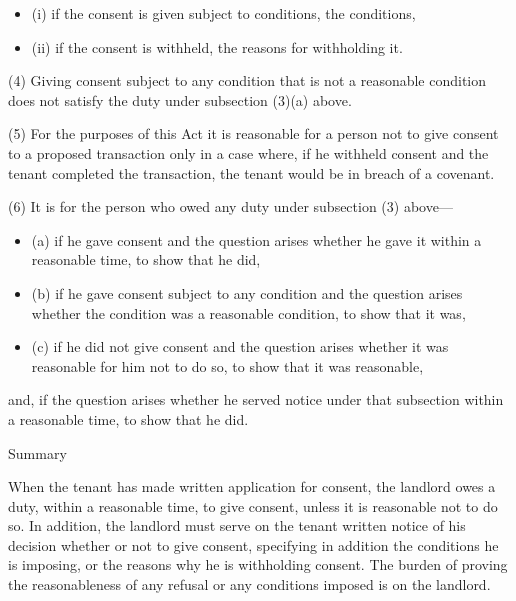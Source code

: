 \documentclass[
]{article}
\providecommand{\tightlist}{%
  \setlength{\itemsep}{0pt}\setlength{\parskip}{0pt}}
\newenvironment{env-2aad614f-6fd6-4025-876c-fcdbeae766fb}
{
    \savenotes\tcolorbox[blanker,breakable,left=5pt,borderline west={2pt}{-4pt}{green}]
}
{
    \endtcolorbox\spewnotes
}
\newenvironment{env-fdd3b853-72b2-4779-a214-b5da0ccdb5e7}
{
    \savenotes\tcolorbox[blanker,breakable,left=5pt,borderline west={2pt}{-4pt}{gray}]
}
{
    \endtcolorbox\spewnotes
}
\begin{document}
\begin{env-2aad614f-6fd6-4025-876c-fcdbeae766fb}
\begin{itemize}
  \begin{itemize}
  \tightlist
  \item
    (i) if the consent is given subject to conditions, the conditions,
  \item
    (ii) if the consent is withheld, the reasons for withholding it.
  \end{itemize}
\end{itemize}

(4) Giving consent subject to any condition that is not a reasonable
condition does not satisfy the duty under subsection (3)(a) above.

(5) For the purposes of this Act it is reasonable for a person not to
give consent to a proposed transaction only in a case where, if he
withheld consent and the tenant completed the transaction, the tenant
would be in breach of a covenant.

(6) It is for the person who owed any duty under subsection (3) above---

\begin{itemize}
\tightlist
\item
  (a) if he gave consent and the question arises whether he gave it
  within a reasonable time, to show that he did,
\item
  (b) if he gave consent subject to any condition and the question
  arises whether the condition was a reasonable condition, to show that
  it was,
\item
  (c) if he did not give consent and the question arises whether it was
  reasonable for him not to do so, to show that it was reasonable,
\end{itemize}

and, if the question arises whether he served notice under that
subsection within a reasonable time, to show that he did.

\end{env-2aad614f-6fd6-4025-876c-fcdbeae766fb}

\begin{env-fdd3b853-72b2-4779-a214-b5da0ccdb5e7}

Summary

When the tenant has made written application for consent, the landlord
owes a duty, within a reasonable time, to give consent, unless it is
reasonable not to do so. In addition, the landlord must serve on the
tenant written notice of his decision whether or not to give consent,
specifying in addition the conditions he is imposing, or the reasons why
he is withholding consent. The burden of proving the reasonableness of
any refusal or any conditions imposed is on the landlord.

\end{env-fdd3b853-72b2-4779-a214-b5da0ccdb5e7}
\end{document}
